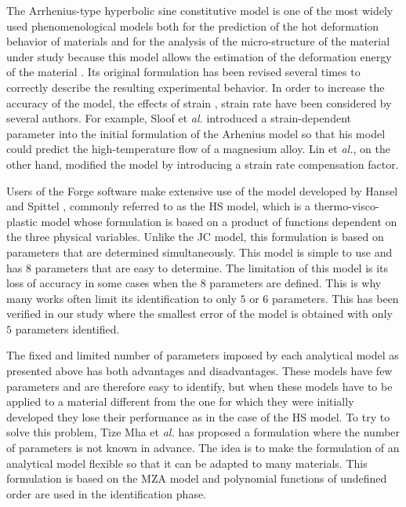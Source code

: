 \documentclass[twoside,english,1p,final,sort&compress]{elsarticle}
\makeatletter
\theoremstyle{plain}
\newcommand*{\eal}{et \emph{al.}\@\xspace}
\makeatother
\begin{document}
The Arrhenius-type hyperbolic sine constitutive model is one of the most widely used phenomenological models both for the prediction of the hot deformation behavior of materials and for the analysis of the micro-structure of the material under study because this model allows the estimation of the deformation energy of the material \cite{Jonas-1969, Zhang-2012, Mostafaei-2012}.
Its original formulation has been revised several times to correctly describe the resulting experimental behavior.
In order to increase the accuracy of the model, the effects of strain \cite{Slooff-2007, Li-2012, Xu-2013}, strain rate \cite{Lin-2008-C, Mandal-2009} have been considered by several authors.
For example, Sloof \eal \cite{Slooff-2007} introduced a strain-dependent parameter into the initial formulation of the Arhenius model so that his model could predict the high-temperature flow of a magnesium alloy.
Lin \eal \cite{Lin-2008-C}, on the other hand, modified the model by introducing a strain rate compensation factor.

Users of the Forge software make extensive use of the model developed by Hansel and Spittel \cite{Hensel-1978}, commonly referred to as the HS model, which is a thermo-visco-plastic model whose formulation is based on a product of functions dependent on the three physical variables.
Unlike the JC model, this formulation is based on parameters that are determined simultaneously.
This model is simple to use and has $8$ parameters that are easy to determine.
The limitation of this model is its loss of accuracy in some cases when the $8$ parameters are defined.
This is why many works often limit its identification to only $5$ or $6$ parameters.
This has been verified in our study where the smallest error of the model is obtained with only $5$ parameters identified.

The fixed and limited number of parameters imposed by each analytical model as presented above has both advantages and disadvantages.
These models have few parameters and are therefore easy to identify, but when these models have to be applied to a material different from the one for which they were initially developed they lose their performance as in the case of the HS model.
To try to solve this problem, Tize Mha \eal \cite{TizeMha-2022} has proposed a formulation where the number of parameters is not known in advance.
The idea is to make the formulation of an analytical model flexible so that it can be adapted to many materials.
This formulation is based on the MZA model and polynomial functions of undefined order are used in the identification phase.
\end{document}

